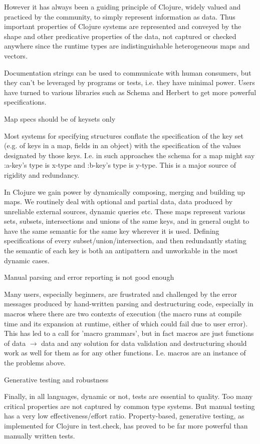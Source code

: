 However it has always been a guiding principle of Clojure, widely valued and
practiced by the community, to simply represent information as data. Thus
important properties of Clojure systems are represented and conveyed by the
shape and other predicative properties of the data, not captured or checked
anywhere since the runtime types are indistinguishable heterogeneous maps and
vectors.

Documentation strings can be used to communicate with human consumers, but they
can’t be leveraged by programs or tests, i.e. they have minimal power. Users
have turned to various libraries such as Schema and Herbert to get more powerful
specifications.

Map specs should be of keysets only

Most systems for specifying structures conflate the specification of the key set
(e.g. of keys in a map, fields in an object) with the specification of the
values designated by those keys. I.e. in such approaches the schema for a map
might say :a-key’s type is x-type and :b-key’s type is y-type. This is a major
source of rigidity and redundancy.

In Clojure we gain power by dynamically composing, merging and building up maps.
We routinely deal with optional and partial data, data produced by unreliable
external sources, dynamic queries etc. These maps represent various sets,
subsets, intersections and unions of the same keys, and in general ought to have
the same semantic for the same key wherever it is used. Defining specifications
of every subset/union/intersection, and then redundantly stating the semantic of
each key is both an antipattern and unworkable in the most dynamic cases.

Manual parsing and error reporting is not good enough

Many users, especially beginners, are frustrated and challenged by the error
messages produced by hand-written parsing and destructuring code, especially in
macros where there are two contexts of execution (the macro runs at compile time
and its expansion at runtime, either of which could fail due to user error).
This has led to a call for 'macro grammars', but in fact macros are just
functions of data $\rightarrow$ data and any solution for data validation and destructuring
should work as well for them as for any other functions. I.e. macros are an
instance of the problems above.

Generative testing and robustness

Finally, in all languages, dynamic or not, tests are essential to quality. Too
many critical properties are not captured by common type systems. But manual
testing has a very low effectiveness/effort ratio. Property-based, generative
testing, as implemented for Clojure in test.check, has proved to be far more
powerful than manually written tests.

